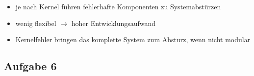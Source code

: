 \begin{enumerate}
\begin{minipage}[t]{0.45\textwidth}
      \end{minipage}
      \hfill
      \begin{minipage}[t]{0.45\textwidth}
      \begin{itemize}[label=\ensuremath{-}]
      \item je nach Kernel führen fehlerhafte Komponenten zu Systemabstürzen
      \item wenig flexibel $ \rightarrow $ hoher Entwicklungsaufwand
      \item Kernelfehler bringen das komplette System zum Absturz, wenn nicht modular
      \end{itemize}
    \end{minipage}
\end{enumerate}

\subsection*{Aufgabe 6}

